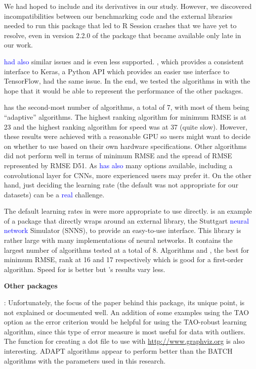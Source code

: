 We had hoped to include  \citep{R-tensorflow} and
its derivatives in our study. However, we discovered incompatibilities
between our benchmarking code and the external libraries needed to run
this package that led to \textsf{R} Session crashes that we have yet to
resolve, even in version 2.2.0 of the package that became available only
late in our work.

 \citep{R-tfestimators} \textcolor{blue}{had also}
similar issues and is even less supported. 
\citep{R-kerasR}, which provides a consistent interface to Keras, a
\textsf{Python} API which provides an easier use interface to
TensorFlow, had the same issue. In the end, we tested the algorithms in
 \citep{R-keras} with the hope that it would be able to
represent the performance of the other packages.

 has the second-most number of algorithms, a total of 7, with
most of them being ``adaptive'' algorithms. The highest ranking
algorithm for minimum RMSE is  at 23 and the highest
ranking algorithm for speed was  at 37 (quite slow).
However, these results were achieved with a reasonable GPU so users
might want to decide on whether to use  based on their own
hardware specifications. Other algorithms did not perform well in terms
of minimum RMSE and the spread of RMSE represented by RMSE D51. As
 \textcolor{blue}{has also} many options available, including
a convolutional layer for CNNs, more experienced users may prefer it. On
the other hand, just deciding the learning rate (the default was not
appropriate for our datasets) can be a \textcolor{blue}{real} challenge.

The default learning rates in  \citep{R-RSNNS} were more
appropriate to use directly.  is an example of a package that
directly wraps around an external library, the Stuttgart
\textcolor{blue}{neural network} Simulator (SNNS), to provide an
easy-to-use interface. This library is rather large with many
implementations of neural networks. It contains the largest number of
algorithms tested at a total of 8. Algorithms  and
, the best for minimum RMSE, rank at 16 and 17 respectively
which is good for a first-order algorithm. Speed for  is
better but 's results vary less.

\textbf{Other packages }

 \citep{R-AMORE}: Unfortunately, the focus of the paper
behind this package, its unique point, is not explained or documented
well. An addition of some examples using the TAO option as the error
criterion would be helpful for using the TAO-robust learning algorithm,
since this type of error measure is most useful for data with outliers.
The function for creating a dot file to use with
\url{http://www.graphviz.org} is also interesting. ADAPT algorithms
appear to perform better than the BATCH algorithms with the parameters
used in this research.

